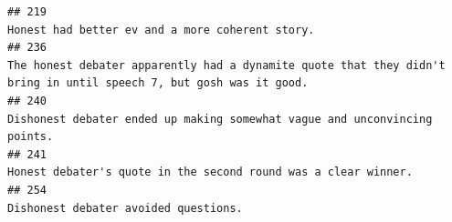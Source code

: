 \documentclass[
]{article}
\begin{document}
\begin{verbatim}
## 219                                                                                                                                                                                                                                                                                                                                                                                                                                                                                                                                                    Honest had better ev and a more coherent story.
## 236                                                                                                                                                                                                                                                                                                                                                                                                                                                                                 The honest debater apparently had a dynamite quote that they didn't bring in until speech 7, but gosh was it good.
## 240                                                                                                                                                                                                                                                                                                                                                                                                                                                                                                                          Dishonest debater ended up making somewhat vague and unconvincing points.
## 241                                                                                                                                                                                                                                                                                                                                                                                                                                                                                                                                     Honest debater's quote in the second round was a clear winner.
## 254                                                                                                                                                                                                                                                                                                                                                                                                                                                                                                                                                               Dishonest debater avoided questions.

\end{verbatim}
\end{document}
